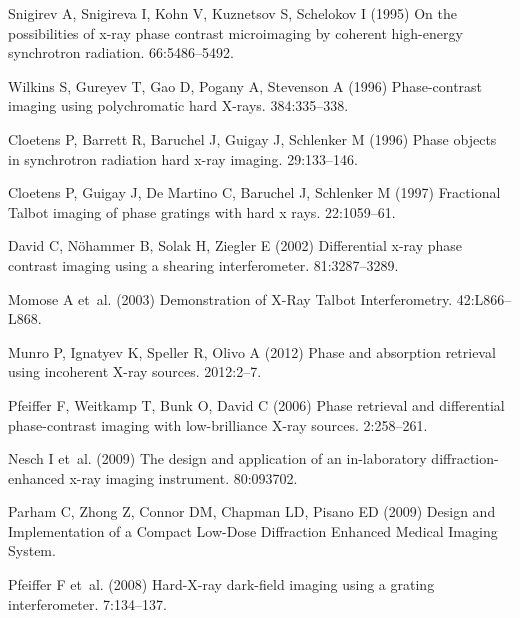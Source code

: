 \documentclass{pnastwo}
\begin{document}
\begin{article}
\begin{thebibliography}{10}
Snigirev A, Snigireva I, Kohn V, Kuznetsov S, Schelokov I (1995) {On the
  possibilities of x-ray phase contrast microimaging by coherent high-energy
  synchrotron radiation}.
 66:5486--5492.

Wilkins S, Gureyev T, Gao D, Pogany A, Stevenson A (1996) {Phase-contrast
  imaging using polychromatic hard X-rays}.
 384:335--338.

Cloetens P, Barrett R, Baruchel J, Guigay J, Schlenker M (1996) {Phase objects
  in synchrotron radiation hard x-ray imaging}.
 29:133--146.

Cloetens P, Guigay J, {De Martino} C, Baruchel J, Schlenker M (1997)
  {Fractional Talbot imaging of phase gratings with hard x rays.}
 22:1059--61.

David C, N\"{o}hammer B, Solak H, Ziegler E (2002) {Differential x-ray phase
  contrast imaging using a shearing interferometer}.
 81:3287--3289.

Momose A et~al. (2003) {Demonstration of X-Ray Talbot Interferometry}.
 42:L866--L868.

Munro P, Ignatyev K, Speller R, Olivo A (2012) {Phase and absorption retrieval
  using incoherent X-ray sources}.
 2012:2--7.

Pfeiffer F, Weitkamp T, Bunk O, David C (2006) {Phase retrieval and
  differential phase-contrast imaging with low-brilliance X-ray sources}.
 2:258--261.

Nesch I et~al. (2009) {The design and application of an in-laboratory
  diffraction-enhanced x-ray imaging instrument.}
 80:093702.

Parham C, Zhong Z, Connor DM, Chapman LD, Pisano ED (2009) {Design and
  Implementation of a Compact Low-Dose Diffraction Enhanced Medical Imaging
  System}.

Pfeiffer F et~al. (2008) {Hard-X-ray dark-field imaging using a grating
  interferometer}.
 7:134--137.


\end{thebibliography}
\end{article}
\end{document}

